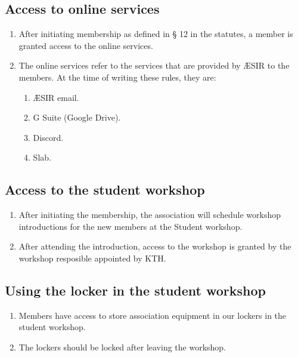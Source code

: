 
\subsection{Access to online services}
\begin{enumerate}
  \item After initiating membership as defined in § 12 in the statutes, a member is granted access to the online services.
  \item The online services refer to the services that are provided by ÆSIR to the members. At the time of writing these rules, they are:
  \begin{enumerate}
    \item ÆSIR email.
    \item G Suite (Google Drive).
    \item Discord.
    \item Slab.
  \end{enumerate}
\end{enumerate}

\subsection{Access to the student workshop}
\begin{enumerate}
  \item After initiating the membership, the association will schedule workshop introductions for the new members at the Student workshop.
  \item After attending the introduction, access to the workshop is granted by the workshop resposible appointed by KTH.
\end{enumerate}

\subsection{Using the locker in the student workshop}
\begin{enumerate}
  \item Members have access to store association equipment in our lockers in the student workshop.
  \item The lockers should be locked after leaving the workshop.
\end{enumerate}

